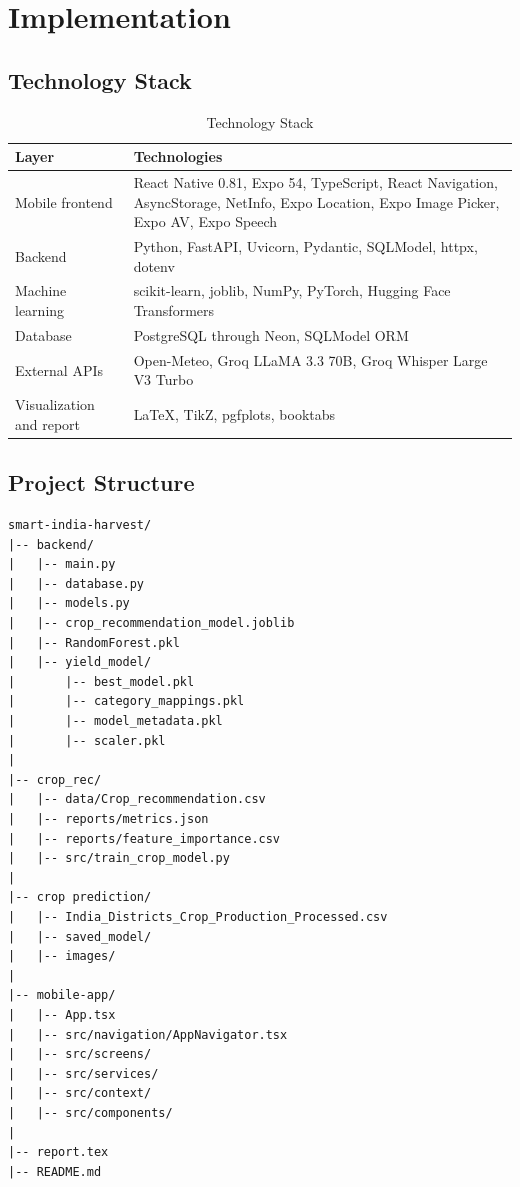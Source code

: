 \documentclass[12pt,a4paper]{report}
\begin{document}
\chapter{Implementation}
\doublespacing

\section{Technology Stack}

\begin{table}[H]
\centering
\caption{Technology Stack}
\label{tab:stack}
\begin{tabular}{p{4cm}p{9.5cm}}
\toprule
\textbf{Layer} & \textbf{Technologies} \\
\midrule
Mobile frontend & React Native 0.81, Expo 54, TypeScript, React Navigation, AsyncStorage, NetInfo, Expo Location, Expo Image Picker, Expo AV, Expo Speech \\
Backend & Python, FastAPI, Uvicorn, Pydantic, SQLModel, httpx, dotenv \\
Machine learning & scikit-learn, joblib, NumPy, PyTorch, Hugging Face Transformers \\
Database & PostgreSQL through Neon, SQLModel ORM \\
External APIs & Open-Meteo, Groq LLaMA 3.3 70B, Groq Whisper Large V3 Turbo \\
Visualization and report & LaTeX, TikZ, pgfplots, booktabs \\
\bottomrule
\end{tabular}
\end{table}

\section{Project Structure}

\begin{verbatim}
smart-india-harvest/
|-- backend/
|   |-- main.py
|   |-- database.py
|   |-- models.py
|   |-- crop_recommendation_model.joblib
|   |-- RandomForest.pkl
|   |-- yield_model/
|       |-- best_model.pkl
|       |-- category_mappings.pkl
|       |-- model_metadata.pkl
|       |-- scaler.pkl
|
|-- crop_rec/
|   |-- data/Crop_recommendation.csv
|   |-- reports/metrics.json
|   |-- reports/feature_importance.csv
|   |-- src/train_crop_model.py
|
|-- crop prediction/
|   |-- India_Districts_Crop_Production_Processed.csv
|   |-- saved_model/
|   |-- images/
|
|-- mobile-app/
|   |-- App.tsx
|   |-- src/navigation/AppNavigator.tsx
|   |-- src/screens/
|   |-- src/services/
|   |-- src/context/
|   |-- src/components/
|
|-- report.tex
|-- README.md
\end{verbatim}
\end{document}
